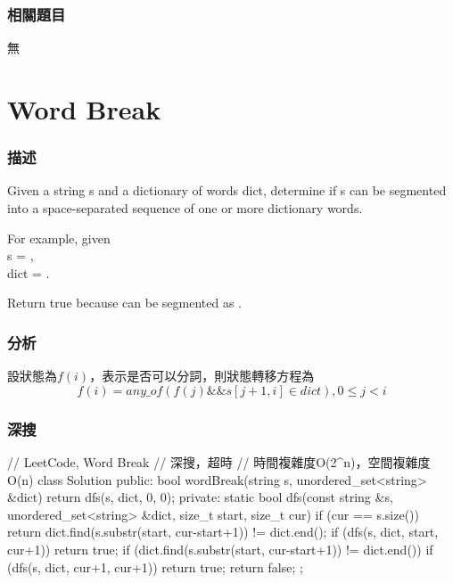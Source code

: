 \subsubsection{相關題目}
\begindot
\item 無
\myenddot


\section{Word Break} %
\label{sec:word-break}


\subsubsection{描述}
Given a string s and a dictionary of words dict, determine if s can be segmented into a space-separated sequence of one or more dictionary words.

For example, given \\
s = ,\\
dict = .

Return true because  can be segmented as .


\subsubsection{分析}
設狀態為$f(i)$，表示是否可以分詞，則狀態轉移方程為
$$
f(i) = any\_of(f(j) \&\& s[j+1,i] \in dict),  0 \leq j < i
$$


\subsubsection{深搜}
\begin{Code}
// LeetCode, Word Break
// 深搜，超時
// 時間複雜度O(2^n)，空間複雜度O(n)
class Solution {
public:
    bool wordBreak(string s, unordered_set<string> &dict) {
        return dfs(s, dict, 0, 0);
    }
private:
    static bool dfs(const string &s, unordered_set<string> &dict,
            size_t start, size_t cur) {
        if (cur == s.size()) {
            return dict.find(s.substr(start, cur-start+1)) != dict.end();
        }
        if (dfs(s, dict, start, cur+1)) return true;
        if (dict.find(s.substr(start, cur-start+1)) != dict.end())
            if (dfs(s, dict, cur+1, cur+1)) return true;
        return false;
    }
};
\end{Code}


